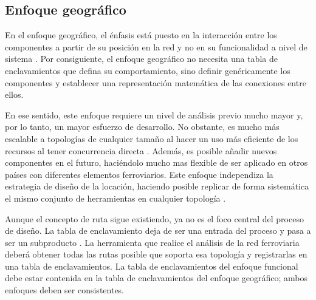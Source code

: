 \subsection{Enfoque geográfico}

    En el enfoque geográfico, el énfasis está puesto en la interacción entre los componentes a partir de su posición en la red y no en su funcionalidad a nivel de sistema \cite{Paper_62,Paper_101,Paper_102,Paper_103}. Por consiguiente, el enfoque geográfico no necesita una tabla de enclavamientos que defina su comportamiento, sino definir genéricamente los componentes y establecer una representación matemática de las conexiones entre ellos. 
    
    En ese sentido, este enfoque requiere un nivel de análisis previo mucho mayor y, por lo tanto, un mayor esfuerzo de desarrollo. No obstante, es mucho más escalable a topologías de cualquier tamaño al hacer un uso más eficiente de los recursos al tener concurrencia directa \cite{Paper_99,Paper_146,Paper_168}. Además, es posible añadir nuevos componentes en el futuro, haciéndolo mucho mas flexible de ser aplicado en otros países con diferentes elementos ferroviarios. Este enfoque independiza la estrategia de diseño de la locación, haciendo posible replicar de forma sistemática el mismo conjunto de herramientas en cualquier topología \cite{Paper_180,Paper_182,Paper_200}.

    Aunque el concepto de ruta sigue existiendo, ya no es el foco central del proceso de diseño. La tabla de enclavamiento deja de ser una entrada del proceso y pasa a ser un subproducto \cite{Paper_200}. La herramienta que realice el análisis de la red ferroviaria deberá obtener todas las rutas posible que soporta esa topología y registrarlas en una tabla de enclavamientos. La tabla de enclavamientos del enfoque funcional debe estar contenida en la tabla de enclavamientos del enfoque geográfico; ambos enfoques deben ser consistentes.